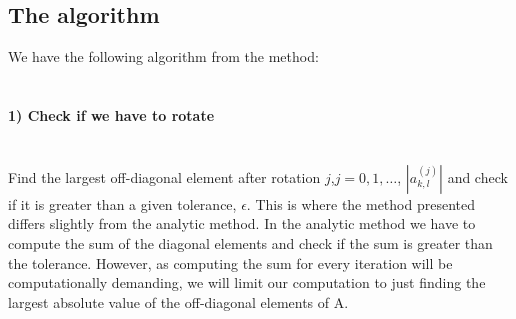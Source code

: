 \documentclass[12pt]{article}
\begin{document}
	 \subsection{The algorithm}
	 We have the following algorithm from the method: \\ \\
	 \paragraph{1) Check if we have to rotate} \hfill \\
	  Find the largest off-diagonal element after rotation $j$,$j=0,1,\dots$, $|a_{k,l}^{(j)}|$ and check if it is greater than a given tolerance, $\epsilon$. This is where the method presented differs slightly from the analytic method. In the analytic method we have to compute the sum of the diagonal elements and check if the sum is greater than the tolerance. However, as computing the sum for every iteration will be computationally demanding, we will limit our computation to just finding the largest absolute value of the off-diagonal elements of A. \\ 
\end{document}
